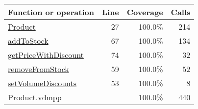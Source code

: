 \bigskip
\begin{longtable}{|l|r|r|r|}
\hline
Function or operation & Line & Coverage & Calls \\
\hline
\hline
\hyperref[Product:27]{Product} & 27&100.0\% & 214 \\
\hline
\hyperref[addToStock:67]{addToStock} & 67&100.0\% & 134 \\
\hline
\hyperref[getPriceWithDiscount:74]{getPriceWithDiscount} & 74&100.0\% & 32 \\
\hline
\hyperref[removeFromStock:59]{removeFromStock} & 59&100.0\% & 52 \\
\hline
\hyperref[setVolumeDiscounts:53]{setVolumeDiscounts} & 53&100.0\% & 8 \\
\hline
\hline
Product.vdmpp & & 100.0\% & 440 \\
\hline
\end{longtable}

